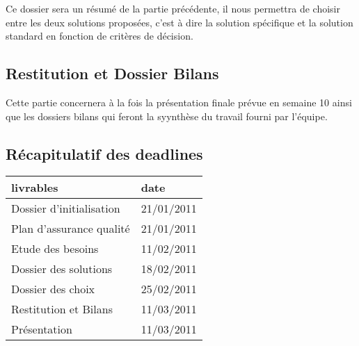 Ce dossier sera un résumé de la partie précédente, il nous permettra de choisir entre les deux solutions proposées, c'est à dire la solution spécifique et la solution standard en fonction de critères de décision. 

\subsection{Restitution et Dossier Bilans}

Cette partie concernera à la fois la présentation finale prévue en semaine 10 ainsi que les dossiers bilans qui feront la syynthèse du travail fourni par l'équipe.

\subsection{Récapitulatif des deadlines}

\begin{tabular}{|l|l|}
\hline
livrables& date\\
\hline
Dossier d'initialisation& 21/01/2011\\
\hline
Plan d'assurance qualité& 21/01/2011\\
\hline
Etude des besoins& 11/02/2011\\
\hline
Dossier des solutions& 18/02/2011\\
\hline
Dossier des choix& 25/02/2011\\
\hline
Restitution et Bilans& 11/03/2011\\
\hline
Présentation&  11/03/2011\\
\hline
\end{tabular}


